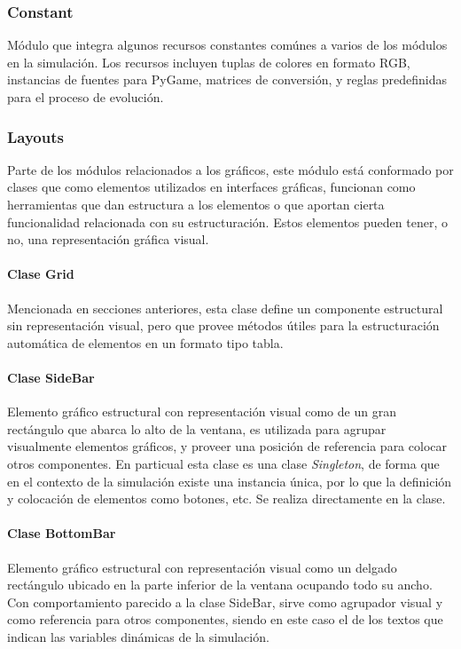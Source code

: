 \documentclass[]{article}
\begin{document}
		\subsubsection{Constant}
			Módulo que integra algunos recursos constantes comúnes a varios de los módulos en la simulación. Los recursos incluyen tuplas de colores en formato RGB, instancias de fuentes para PyGame, matrices de conversión, y reglas predefinidas para el proceso de evolución.
			
			
			
		\subsubsection{Layouts}
			Parte de los módulos relacionados a los gráficos, este módulo está conformado por clases que como elementos utilizados en interfaces gráficas, funcionan como herramientas que dan estructura a los elementos o que aportan cierta funcionalidad relacionada con su estructuración. Estos elementos pueden tener, o no, una representación gráfica visual.
			
			\paragraph{Clase Grid}
				Mencionada en secciones anteriores, esta clase define un componente estructural sin representación visual, pero que provee métodos útiles para la estructuración automática de elementos en un formato tipo tabla.
				
			\paragraph{Clase SideBar}
				Elemento gráfico estructural con representación visual como de un gran rectángulo que abarca lo alto de la ventana, es utilizada para agrupar visualmente elementos gráficos, y proveer una posición de referencia para colocar otros componentes. En particual esta clase es una clase \textit{Singleton}, de forma que en el contexto de la simulación existe una instancia única, por lo que la definición y colocación de elementos como botones, etc. Se realiza directamente en la clase.
				
			\paragraph{Clase BottomBar}
				Elemento gráfico estructural con representación visual como un delgado rectángulo ubicado en la parte inferior de la ventana ocupando todo su ancho. Con comportamiento parecido a la clase SideBar, sirve como agrupador visual y como referencia para otros componentes, siendo en este caso el de los textos que indican las variables dinámicas de la simulación.
			
\end{document}
